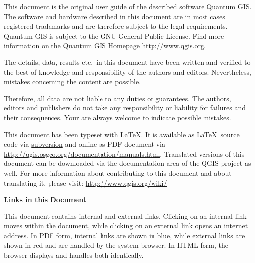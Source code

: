 \frontmatter
\pagestyle{scrplain}
\vspace{1cm}


This document is the original user guide of the described 
software Quantum GIS. The software and hardware described in this 
document are in most cases registered trademarks and are therefore subject 
to the legal requirements. Quantum GIS is subject to the GNU General Public 
License. Find more information on the Quantum GIS Homepage
\url{http://www.qgis.org}.
\par\bigskip
The details, data, results etc.~in this document have been 
written and verified to the best of knowledge and responsibility of the 
authors and editors. Nevertheless, mistakes concerning the content are possible.
\par\bigskip
Therefore, all data are not liable to any duties or guarantees. The authors, editors 
and publishers do not take any responsibility or liability for failures and 
their consequences. Your are always welcome to indicate possible mistakes.
\par\bigskip
This document has been typeset with \LaTeX. It is available as \LaTeX~source
code via \href{http://wiki.qgis.org/qgiswiki/DocumentationWritersCorner}{subversion} 
and online as PDF document via \url{http://qgis.osgeo.org/documentation/manuals.html}. 
Translated versions of this document can be downloaded via the documentation 
area of the QGIS project as well. For more information about contributing to
this document and about translating it, please visit: \url{http://www.qgis.org/wiki/} 

\vspace{1cm}
\noindent
\textbf{Links in this Document}
\par\bigskip
This document contains internal and external links.  Clicking on an
internal link moves within the document, while clicking on an external link
opens an internet address.  In PDF form, internal links are shown in blue,
while external links are shown in red and are handled by the
system browser. In HTML form, the browser displays and handles both
identically. 

\newpage

